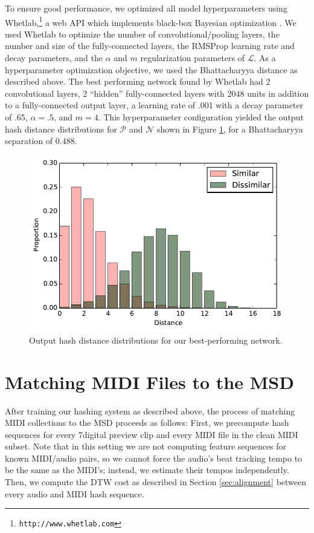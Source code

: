\documentclass{article}
\begin{document}
To ensure good performance, we optimized all model hyperparameters using Whetlab,\footnote{\texttt{http://www.whetlab.com}} a web API which implements black-box Bayesian optimization \cite{snoek2012practical}.
We used Whetlab to optimize the number of convolutional/pooling layers, the number and size of the fully-connected layers, the RMSProp learning rate and decay parameters, and the $\alpha$ and $m$ regularization parameters of $\mathcal{L}$.
As a hyperparameter optimization objective, we used the Bhattacharyya distance as described above.
The best performing network found by Whetlab had 2 convolutional layers, 2 ``hidden'' fully-connected layers with 2048 units in addition to a fully-connected output layer, a learning rate of .001 with a decay parameter of .65, $\alpha = .5$, and $m = 4$.
This hyperparameter configuration yielded the output hash distance distributions for $\mathcal{P}$ and $\mathcal{N}$ shown in Figure \ref{fig:distances}, for a Bhattacharyya separation of $0.488$.

\begin{figure}
  \includegraphics[width=\columnwidth]{hash_distributions.pdf}
  \caption{Output hash distance distributions for our best-performing network.}
  \label{fig:distances}
\end{figure}

\section{Matching MIDI Files to the MSD}
\label{sec:msd}

After training our hashing system as described above, the process of matching MIDI collections to the MSD proceeds as follows:
First, we precompute hash sequences for every 7digital preview clip and every MIDI file in the clean MIDI subset.
Note that in this setting we are not computing feature sequences for known MIDI/audio pairs, so we cannot force the audio's beat tracking tempo to be the same as the MIDI's; instead, we estimate their tempos independently.
Then, we compute the DTW cost as described in Section \ref{sec:alignment} between every audio and MIDI hash sequence.
\end{document}
